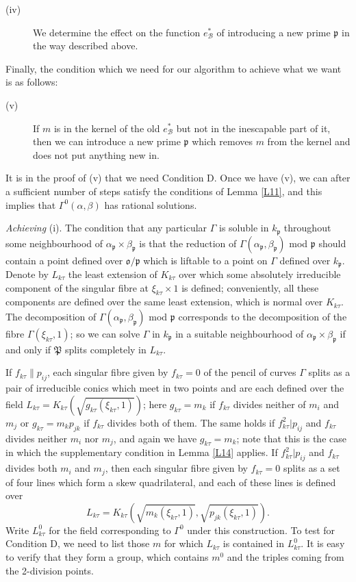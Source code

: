 \documentclass[12pt]{article}
\def\fo{{\mathfrak o}}
\def\fp{{\mathfrak p}}
\def\fP{{\mathfrak P}}
\def\ga{{\alpha}}
\def\gb{{\beta}}
\def\gG{{\Gamma}}
\def\sB{{\mathcal B}}
\def\beq{\begin{equation} \label}
\begin{document}
\begin{description}
\item[(iv)] We determine the effect on the function $e^*_\sB$
of introducing a new prime $\fp$ in the way described above.
\end{description}
Finally, the condition which we need for our algorithm to
achieve what we want is as follows:
\begin{description}
\item[(v)] If $m$ is in the kernel of the old $e^*_\sB$ but not
in the inescapable part of it, then we can introduce a new
prime $\fp$ which removes $m$ from the kernel and does not put
anything new in.
\end{description}
It is in the proof of (v) that we need Condition D. Once we
have (v), we can after a sufficient number of steps satisfy
the conditions of Lemma \ref{L11}, and this implies that
$\gG^0(\ga,\gb)$ has rational solutions.

\medskip

\noindent \emph{Achieving} (i).
The condition that any particular
$\gG$ is soluble in $k_\fp$ throughout some neighbourhood of
$\ga_\fp\times\gb_\fp$ is that the
reduction of $\gG(\ga_\fp,\gb_\fp)$ mod $\fp$ should contain a
point defined over $\fo/\fp$ which is liftable to a point on
$\gG$ defined over $k_\fp$. Denote by $L_{k\tau}$ the least
extension of $K_{k\tau}$ over which some absolutely
irreducible component of the singular fibre at $\xi_{k\tau}
\times1$ is defined; conveniently, all these components are
defined over the same least extension, which is normal over
$K_{k\tau}$. The decomposition of $\gG(\ga_\fp,\gb_\fp)$
mod $\fp$ corresponds to the decomposition of the fibre
$\gG(\xi_{k\tau},1)$; so we can solve $\gG$ in
$k_\fp$ in a suitable neighbourhood of $\ga_\fp\times\gb_\fp$
if and only if $\fP$ splits completely in $L_{k\tau}$.

If $f_{k\tau}\|p_{ij}$,
each singular fibre given by $f_{k\tau}=0$
of the pencil of curves $\gG$ splits as a pair
of irreducible conics which meet in two points and are each
defined over the field $L_{k\tau}=K_{k\tau}(\sqrt
{g_{k\tau}(\xi_{k\tau},1)})$; here $g_{k\tau}=m_k$ if
$f_{k\tau}$ divides neither of $m_i$ and $m_j$ or
$g_{k\tau}=m_kp_{jk}$ if $f_{k\tau}$
divides both of them. The same holds if $f^2_{k\tau}|p_{ij}$ and $f_{k\tau}$
divides neither $m_i$ nor $m_j$, and again we have $g_{k\tau}=m_k$;
note that this is the case in which the supplementary condition in Lemma
\ref{L14} applies.
If $f^2_{k\tau}|p_{ij}$ and $f_{k\tau}$ divides both $m_i$ and $m_j$, then
each singular fibre given by $f_{k\tau}=0$ splits as a set of four lines which
form a skew quadrilateral, and each of these lines is defined over
\beq{E56} L_{k\tau}=K_{k\tau}\left(\sqrt{m_k(\xi_{k\tau},1)},
\sqrt{p_{jk}(\xi_{k\tau},1)}\right). \end{equation}
Write $L^0_{k\tau}$ for the field corresponding to
$\gG^0$ under this construction. To test for Condition D, we
need to list those $m$ for
which $L_{k\tau}$ is contained in $L^0_{k\tau}$. It is easy to
verify that they form a group, which contains $m^0$ and the
triples coming from the 2-division points.
\end{document}

